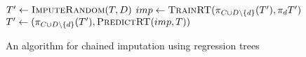   \begin{algorithmic}
    
    	\State $T' \gets \Call{ImputeRandom}{T, D}$
            \State $imp \gets \Call{TrainRT}{\pi_{C \cup D \backslash \{d\}}(T'), \pi_d{T'}}$
            \State $T' \gets (\pi_{C \cup D \backslash \{d\}}(T'), \Call{PredictRT}{imp, T})$
		\EndFor
	\EndFor
	\EndFunction
  \end{algorithmic}
  \caption{An algorithm for chained imputation using regression trees}
  \label{algo:imputation-strategy}
